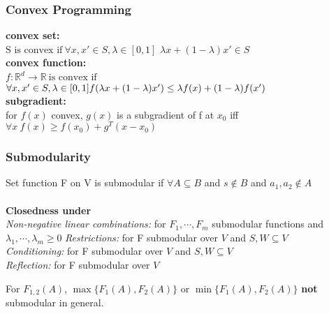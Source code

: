 \documentclass[7pt,parskip]{scrartcl}
\begin{document}
\begin{multicols*}{3}
\subsubsection{Convex Programming} %
\label{ssub:convex_programming}
\textbf{convex set:}\\
$\textrm{S is convex if} \ \forall x, x' \in S , \lambda \in [0,1]$
$\lambda x + (1- \lambda) x' \in S $ \\
\textbf{convex function:}\\
$f:\mathbb{R}^d \to \mathbb{R} \ \textrm{is convex if}$ \  
$\forall x, x' \in S , \lambda \in [0,1] \\
f(\lambda x + (1-\lambda)x') \leq \lambda f(x) + (1-\lambda) f(x')$ \\
\textbf{subgradient:}\\
for $f(x)$ convex, $g(x)$ is a subgradient of f at $x_0$ iff \\
$\forall x \ f(x) \geq f(x_0) + g^T(x-x_0)$

\subsubsection{Submodularity} %
\label{ssub:submodularity}
Set function F on V is submodular if $\forall A \subseteq B$ and $s \notin B$ and $a_1,a_2 \notin A$\\
 \\

\textbf{Closedness under}\\
\emph{Non-negative linear combinations: } for $F_1,\cdots,F_m$ submodular functions and $\lambda_1, \cdots, \lambda_m \geq 0$
\emph{Restrictions: } for F submodular over $V$ and $S,W \subseteq V$ \\
\emph{Conditioning: } for F submodular over $V$ and $S,W \subseteq V$ \\
\emph{Reflection: } for F submodular over $V$
\begin{mdframed}
	For $F_{1,2}(A)$, $\max \{F_1(A),F_2(A) \}$ or $\min \{F_1(A),F_2(A) \}$ \textbf{not} submodular in general.
\end{mdframed}


\end{multicols*}
\end{document}
